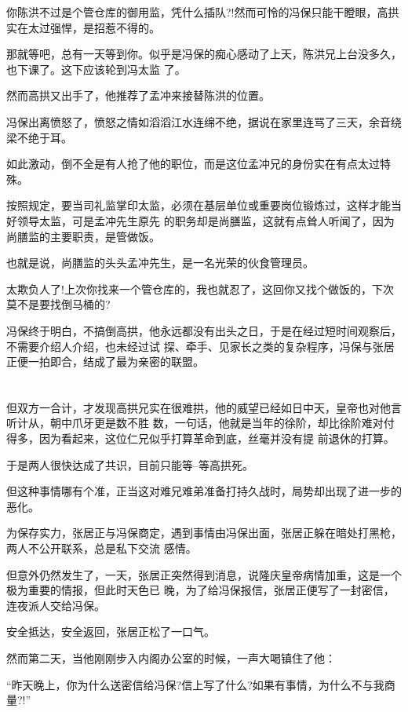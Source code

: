 \documentclass[11pt,a4paper,onecolumn]{article}
\begin{document}
你陈洪不过是个管仓库的御用监，凭什么插队?!然而可怜的冯保只能干瞪眼，高拱实在太过强悍，是招惹不得的。

那就等吧，总有一天等到你。似乎是冯保的痴心感动了上天，陈洪兄上台没多久，也下课了。这下应该轮到冯太监
了。

然而高拱又出手了，他推荐了孟冲来接替陈洪的位置。

冯保出离愤怒了，愤怒之情如滔滔江水连绵不绝，据说在家里连骂了三天，余音绕梁不绝于耳。

如此激动，倒不全是有人抢了他的职位，而是这位孟冲兄的身份实在有点太过特殊。

按照规定，要当司礼监掌印太监，必须在基层单位或重要岗位锻炼过，这样才能当好领导太监，可是孟冲先生原先
的职务却是尚膳监，这就有点耸人听闻了，因为尚膳监的主要职责，是管做饭。

也就是说，尚膳监的头头孟冲先生，是一名光荣的伙食管理员。

太欺负人了!上次你找来一个管仓库的，我也就忍了，这回你又找个做饭的，下次莫不是要找倒马桶的?

冯保终于明白，不搞倒高拱，他永远都没有出头之日，于是在经过短时间观察后，不需要介绍人介绍，也未经过试
探、牵手、见家长之类的复杂程序，冯保与张居正便一拍即合，结成了最为亲密的联盟。

\section[\thesection]{}

但双方一合计，才发现高拱兄实在很难拱，他的威望已经如日中天，皇帝也对他言听计从，朝中爪牙更是数不胜
数，一句话，他就是当年的徐阶，却比徐阶难对付得多，因为看起来，这位仁兄似乎打算革命到底，丝毫并没有提
前退休的打算。

于是两人很快达成了共识，目前只能等--等高拱死。

但这种事情哪有个准，正当这对难兄难弟准备打持久战时，局势却出现了进一步的恶化。

为保存实力，张居正与冯保商定，遇到事情由冯保出面，张居正躲在暗处打黑枪，两人不公开联系，总是私下交流
感情。

但意外仍然发生了，一天，张居正突然得到消息，说隆庆皇帝病情加重，这是一个极为重要的情报，但此时天色已
晚，为了给冯保报信，张居正便写了一封密信，连夜派人交给冯保。

安全抵达，安全返回，张居正松了一口气。

然而第二天，当他刚刚步入内阁办公室的时候，一声大喝镇住了他：

``昨天晚上，你为什么送密信给冯保?信上写了什么?如果有事情，为什么不与我商量?!''
\end{document}
